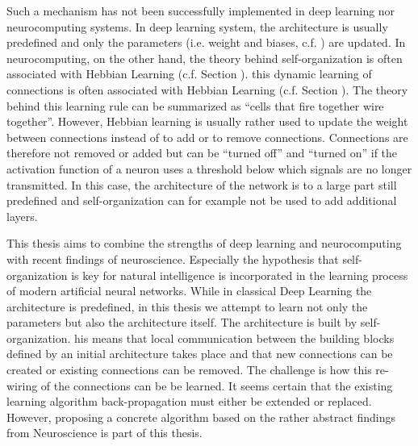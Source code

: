 Such a mechanism has not been successfully implemented in deep learning nor neurocomputing systems.
In deep learning system, the architecture is usually predefined and only the parameters (i.e. weight and biases, c.f. ) are updated.
In neurocomputing, on the other hand, the theory behind self-organization is often associated with Hebbian Learning (c.f. Section ).
this dynamic learning of connections is often associated with Hebbian Learning (c.f. Section ).
The theory behind this learning rule can be summarized as ``cells that fire together wire together''.
However, Hebbian learning is usually rather used to update the weight between connections instead of to add or to remove connections.
Connections are therefore not removed or added but can be ``turned off'' and ``turned on'' if the activation function of a neuron uses a threshold below which signals are no longer transmitted.
In this case, the architecture of the network is to a large part still predefined and self-organization can for example not be used to add additional layers.

This thesis aims to combine the strengths of deep learning and neurocomputing with recent findings of neuroscience.
Especially the hypothesis that self-organization is key for natural intelligence is incorporated in the learning process of modern artificial neural networks.
While in classical Deep Learning the architecture is predefined, in this thesis we attempt to learn not only the parameters but also the architecture itself.
The architecture is built by self-organization. 
his means that local communication between the building blocks defined by an initial architecture takes place and that new connections can be created or existing connections can be removed.
The challenge is how this re-wiring of the connections can be be learned.
It seems certain that the existing learning algorithm back-propagation must either be extended or replaced.
However, proposing a concrete algorithm based on the rather abstract findings from Neuroscience is part of this thesis.



